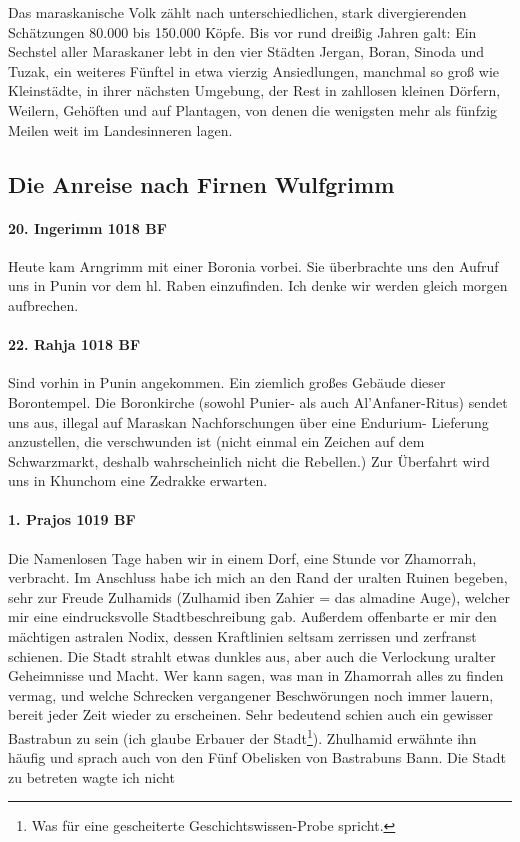 Das maraskanische Volk zählt nach unterschiedlichen, stark divergierenden Schätzungen 80.000 bis 150.000 Köpfe. Bis vor rund dreißig Jahren galt: Ein Sechstel aller Maraskaner lebt in den vier Städten Jergan, Boran, Sinoda und Tuzak, ein weiteres Fünftel in etwa vierzig Ansiedlungen, manchmal so groß wie Kleinstädte, in ihrer nächsten Umgebung, der Rest in zahllosen kleinen Dörfern, Weilern, Gehöften und auf Plantagen, von denen die wenigsten mehr als fünfzig Meilen weit im Landesinneren lagen.


\subsection{Die Anreise nach Firnen Wulfgrimm}
\paragraph{20. Ingerimm 1018 BF}
Heute kam Arngrimm mit einer Boronia vorbei. Sie überbrachte uns den Aufruf uns in Punin vor dem hl. Raben einzufinden. Ich denke wir werden gleich morgen aufbrechen.

\paragraph{22. Rahja 1018 BF}
Sind vorhin in Punin angekommen. Ein ziemlich großes Gebäude dieser Borontempel. Die Boronkirche (sowohl Punier- als auch Al'Anfaner-Ritus) sendet uns aus, illegal auf Maraskan Nachforschungen über eine Endurium- Lieferung anzustellen, die verschwunden ist (nicht einmal ein Zeichen auf dem Schwarzmarkt, deshalb wahrscheinlich nicht die Rebellen.) Zur Überfahrt wird uns in Khunchom eine Zedrakke erwarten.

\paragraph{1. Prajos 1019 BF}
Die Namenlosen Tage haben wir in einem Dorf, eine Stunde vor Zhamorrah, verbracht. Im Anschluss habe ich mich an den Rand der uralten Ruinen begeben, sehr zur Freude Zulhamids (Zulhamid iben Zahier = das almadine Auge), welcher mir eine eindrucksvolle Stadtbeschreibung gab. Außerdem offenbarte er mir den mächtigen astralen Nodix, dessen Kraftlinien seltsam zerrissen und zerfranst schienen. Die Stadt strahlt etwas dunkles aus, aber auch die Verlockung uralter Geheimnisse und Macht. Wer kann sagen, was man in Zhamorrah alles zu finden vermag, und welche Schrecken vergangener Beschwörungen noch immer lauern, bereit jeder Zeit wieder zu erscheinen. Sehr bedeutend schien auch ein gewisser Bastrabun zu sein (ich glaube Erbauer der Stadt\footnote{Was für eine gescheiterte Geschichtswissen-Probe spricht.}). Zhulhamid erwähnte ihn häufig und sprach auch von den Fünf Obelisken von Bastrabuns Bann. Die Stadt zu betreten wagte ich nicht

